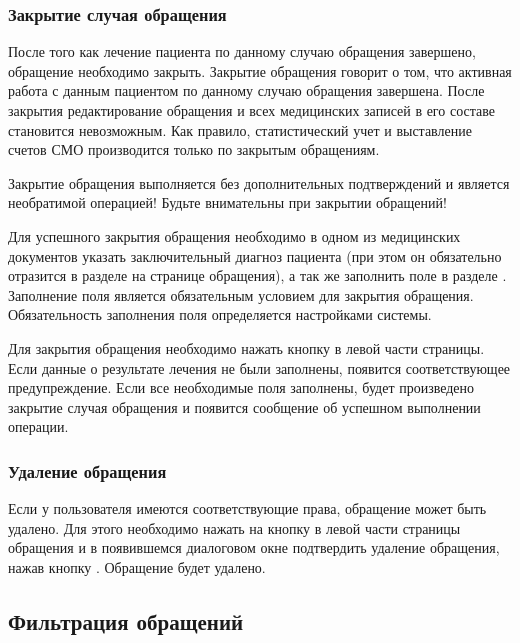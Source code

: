 {\subsubsection{Закрытие случая обращения}

После того как лечение пациента по данному случаю обращения завершено, обращение необходимо закрыть. Закрытие обращения говорит о том, что активная работа с данным пациентом по данному случаю обращения завершена. После закрытия редактирование обращения и всех медицинских записей в его составе становится невозможным. Как правило, статистический учет и выставление счетов СМО производится только по закрытым обращениям.

\begin{vnim}
 Закрытие обращения выполняется без дополнительных подтверждений и является необратимой операцией! Будьте внимательны при закрытии обращений!
\end{vnim} 
 
Для успешного закрытия обращения необходимо в одном из медицинских документов указать заключительный диагноз пациента (при этом он обязательно отразится в разделе  на странице обращения), а так же заполнить поле  в разделе . Заполнение поля  является обязательным условием для закрытия обращения. Обязательность заполнения поля  определяется настройками системы.

Для закрытия обращения необходимо нажать кнопку  в левой части страницы. Если данные о результате лечения не были заполнены, появится соответствующее предупреждение. Если все необходимые поля заполнены, будет произведено закрытие случая обращения и появится сообщение об успешном выполнении операции.

\subsubsection{Удаление обращения}

Если у пользователя имеются соответствующие права, обращение может быть удалено. Для этого необходимо нажать на кнопку  в левой части страницы обращения и в появившемся диалоговом окне подтвердить удаление обращения, нажав кнопку . Обращение будет удалено.

}{}

\subsection{Фильтрация обращений} \label{ev_obr_filtr}

